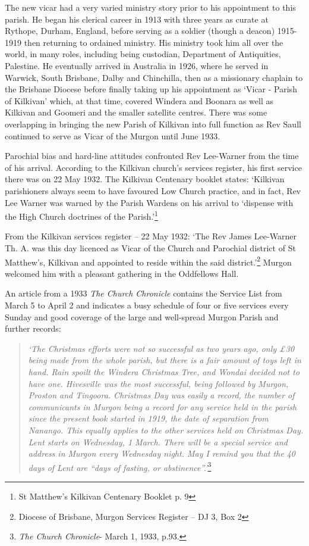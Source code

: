 The new vicar had a very varied ministry story prior to his appointment to this parish. He began his clerical career in 1913 with three years as curate at Rythope, Durham, England, before serving as a soldier (though a deacon) 1915-1919 then returning to ordained ministry. His ministry took him all over the world, in many roles, including being custodian, Department of Antiquities, Palestine. He eventually arrived in Australia in 1926, where he served in Warwick, South Brisbane, Dalby and Chinchilla, then as a missionary chaplain to the Brisbane Diocese before finally taking up his appointment as `Vicar - Parish of Kilkivan' which, at that time, covered Windera and Boonara as well as Kilkivan and Goomeri and the smaller satellite centres. There was some overlapping in bringing the new Parish of Kilkivan into full function as Rev Saull continued to serve as Vicar of the Murgon until June 1933.

Parochial bias and hard-line attitudes confronted Rev Lee-Warner from the time of his arrival. According to the Kilkivan church's services register, his first service there was on 22 May 1932. The Kilkivan Centenary booklet states: `Kilkivan parishioners always seem to have favoured Low Church practice, and in fact, Rev Lee Warner was warned by the Parish Wardens on his arrival to `dispense with the High Church doctrines of the Parish.'\footnote{St Matthew's Kilkivan Centenary Booklet p. 9}

From the Kilkivan services register -- 22 May 1932: `The Rev James Lee-Warner Th. A. was this day licenced as Vicar of the Church and Parochial district of St Matthew's, Kilkivan and appointed to reside within the said district.'\footnote{Diocese of Brisbane, Murgon Services Register -- DJ 3, Box 2} Murgon welcomed him with a pleasant gathering in the Oddfellows Hall.

An article from a 1933 \emph{The Church Chronicle} contains the Service List from March 5 to April 2 and indicates a busy schedule of four or five services every Sunday and good coverage of the large and well-spread Murgon Parish and further records:

\begin{quote}
\emph{`The Christmas efforts were not so successful as two years ago, only £30 being made from the whole parish, but there is a fair amount of toys left in hand. Rain spoilt the Windera Christmas Tree, and Wondai decided not to have one. Hivesville was the most successful, being followed by Murgon, Proston and Tingoora. Christmas Day was easily a record, the number of communicants in Murgon being a record for any service held in the parish since the present book started in 1919, the date of separation from Nanango. This equally applies to the other services held on Christmas Day. Lent starts on Wednesday, 1 March. There will be a special service and address in Murgon every Wednesday night. May I remind you that the 40 days of Lent are ``days of fasting, or abstinence''.'}\footnote{\emph{The Church Chronicle}- March 1, 1933, p.93.}
\end{quote}

